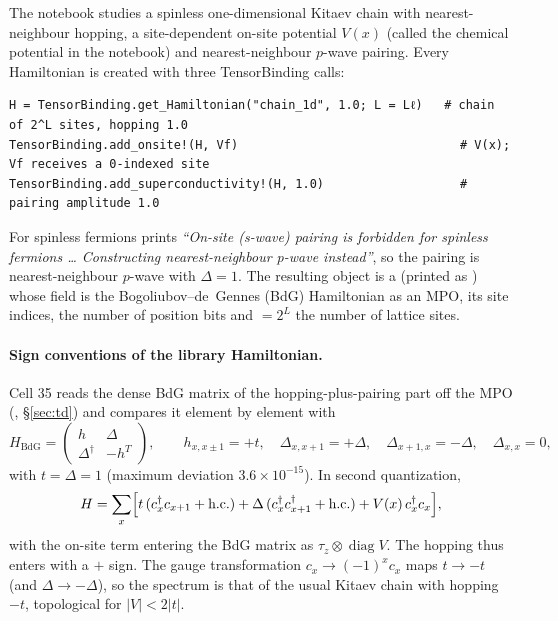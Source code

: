 \documentclass[11pt]{article}
\begin{document}
The notebook studies a spinless one-dimensional Kitaev chain with nearest-neighbour hopping, a site-dependent
on-site potential $V(x)$ (called the chemical potential in the notebook) and nearest-neighbour $p$-wave pairing.
Every Hamiltonian is created with three TensorBinding calls:
\begin{Verbatim}
H = TensorBinding.get_Hamiltonian("chain_1d", 1.0; L = Lℓ)   # chain of 2^L sites, hopping 1.0
TensorBinding.add_onsite!(H, Vf)                               # V(x); Vf receives a 0-indexed site
TensorBinding.add_superconductivity!(H, 1.0)                   # pairing amplitude 1.0
\end{Verbatim}
For spinless fermions  prints \emph{``On-site (s-wave) pairing is forbidden for
spinless fermions \ldots{} Constructing nearest-neighbour p-wave instead''}, so the pairing is nearest-neighbour
$p$-wave with $\Delta = 1$. The resulting object is a  (printed as
) whose field  is the Bogoliubov--de~Gennes (BdG) Hamiltonian as an
MPO,  its site indices,  the number of position bits and $=2^L$ the number of lattice
sites.

\paragraph{Sign conventions of the library Hamiltonian.}
Cell 35 reads the dense BdG matrix of the hopping-plus-pairing part off the MPO (, \S\ref{sec:td})
and compares it element by element with
\[
  H_{\text{BdG}}=\begin{pmatrix} h & \Delta\\ \Delta^\dagger & -h^{T}\end{pmatrix},\qquad
  h_{x,x\pm1}=+t,\quad \Delta_{x,x+1}=+\Delta,\quad \Delta_{x+1,x}=-\Delta,\quad \Delta_{x,x}=0,
\]
with $t=\Delta=1$ (maximum deviation $3.6\times10^{-15}$). In second quantization,
\[
  H=\sum_x\Bigl[t\,(c_x^\dagger c_{x+1}+\text{h.c.})+\Delta\,(c_x^\dagger c_{x+1}^\dagger+\text{h.c.})+V(x)\,c_x^\dagger c_x\Bigr],
\]
with the on-site term entering the BdG matrix as $\tau_z\otimes\operatorname{diag}V$. The hopping thus enters with a
$+$ sign. The gauge transformation $c_x\to(-1)^x c_x$ maps $t\to-t$ (and $\Delta\to-\Delta$), so the spectrum is that of
the usual Kitaev chain with hopping $-t$, topological for $|V|<2|t|$.
\end{document}
